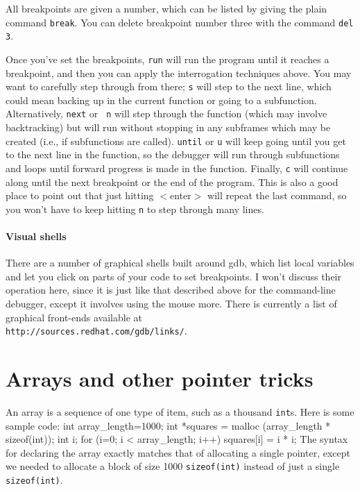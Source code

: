 \documentclass[12pt]{article}
\begin{document}
All breakpoints are given a number, which can be listed by giving the
plain command {\tt break}. You can delete breakpoint number three with
the command {\tt del 3}.

Once you've set the breakpoints, {\tt run} will run the program until it
reaches a breakpoint, and then you can apply the interrogation techniques
above. You may want to carefully step through from there; {\tt s}
will step to the next line, which could mean backing up in the current
function or going to a subfunction. Alternatively, {\tt next} or {\tt
n} will step through the function (which may involve backtracking) but
will run without stopping in any subframes which may be created
(i.e., if subfunctions are called).  {\tt until} or {\tt u} will keep
going until you get to the next line in the function, so the debugger
will run through subfunctions and loops until forward progress is made
in the function.  Finally, {\tt c} will continue along until the next
breakpoint or the end of the program. This is also a good place to
point out that just hitting $<$enter$>$ will repeat the last command,
so you won't have to keep hitting {\tt n} to step through many lines.


\paragraph{Visual shells} There are a number of graphical shells built
around gdb, which list local variables and let you click on parts of
your code to set breakpoints. I won't discuss their operation here, since 
it is just like that described above for the command-line debugger, except
it involves using the mouse more. There is currently a list of graphical
front-ends available at\\ {\tt http://sources.redhat.com/gdb/links/}.

\section{Arrays and other pointer tricks} \label{for_loops} 

An array is a sequence of one type of item, such as a thousand {\tt int}s. Here is some sample code:
int array_length=1000;
int *squares = malloc (array_length * sizeof(int));
int i;
for (i=0; i < array_length; i++)
      {squares[i] = i * i;}
The syntax for declaring the array exactly matches that of allocating
a single pointer, except we needed to allocate a block of size 1000
{\tt * sizeof(int)} instead of just a single {\tt sizeof(int)}. 
\end{document}
